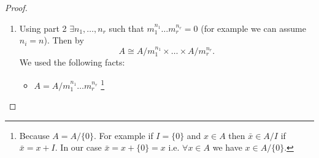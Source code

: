 \begin{theorem}
\begin{proof}
\begin{enumerate}
      $e_1, \dots, e_s$. And as soon as $J^n = J J^n$ we can write a
      vector $e_i \in J^n$ as a vector from $J^n$ multiplied on an
      object from $J$ i.e.
      \[
      e_i = \sum \lambda_{ij} e_j,
      \]
      there $e_j \in J^n, \lambda_{ij} \in J$. Thus if
      $M = Id - \lambda_{ij}$
      \[
      M \cdot \left(
      \begin{array}{c}
        e_1 \\
        \vdots \\
        e_s
      \end{array}
      \right) = 0.
      \]
      It's possible over ring to find a matrix $\tilde{M}$ such that
      \[
      \tilde{M} M = \det M \cdot Id,
      \]
      i.e.
      \[
      \det M \cdot \left(
      \begin{array}{c}
        e_1 \\
        \vdots \\
        e_s
      \end{array}
      \right) = 0.
      \]
      But $\det M = 1 + \lambda$ where $\lambda \in J$.
      \footnote{
        Because the $\det$ consists of the following 
        items $\prod (1-\lambda_{ii}) = 1 + (-1)^s\prod \lambda_{ii}$
        and $\prod \lambda_{ij}$. The sum of the items ($\det$)
        consists of $1$ and another sum in which all items are from
        $J$. Thus the second sum is an element of $J$ i.e.
        $\det M = 1 + \sum \prod \lambda_{ij} = 1 + \lambda$.
      }
      Since  $J = m_1 \cap \dots \cap m_r$ then
      $\forall i: \lambda \in m_i$
      so $\nexists i$ such that $1 + \lambda \in m_i$
      \footnote{
        ???
      }
      thus $1 + \lambda$ is invertable
      \footnote {
        ???
      }
      therefore $e_1 = \dots = e_s = 0$
      \footnote{
        Because $\det M = 1 + \lambda \ne 0$
      }
    \item Using part 2
      $\exists n_1, \dots, n_r$ such that
      $m_1^{n_1} \dots m_r^{n_r} = 0$ (for example we can assume
      $n_i = n$). Then by 
      \[
      A \cong
      A/{m_1^{n_1}} \times \dots \times A/{m_r^{n_r}}.
      \]
      We used the following facts:
      \begin{itemize}
      \item $A = A /m_1^{n_1} \dots m_r^{n_r}$
        \footnote{
          Because $A = A/\{0\}$. For example if $I = \{0\}$ and
          $x \in A$ then $\bar{x} \in A/I$ if $\bar{x} = x + I$. In
          our case $\bar{x} = x + \{0\} = x$ i.e. $\forall x \in A$ we
          have $x \in A/\{0\}$.
}
\end{itemize}
\end{enumerate}
\end{proof}
\end{theorem}
